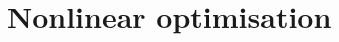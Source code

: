 \documentclass{bookest}
\begin{document}
	\part{Nonlinear optimisation} \label{part_2}
%		
%	
%	
%	
%	
%	
%	
%	
%	
%	
%	
%	
%	
%		
%	
%		
%	
%	
%	
%	
%	
%	
	
\end{document}
